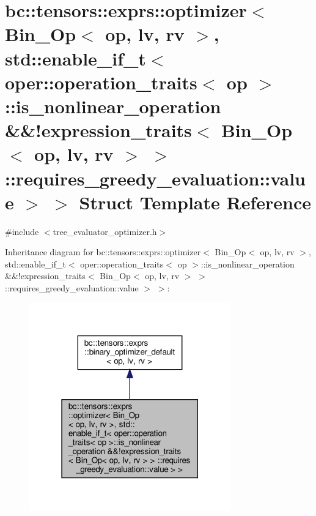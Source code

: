 \hypertarget{structbc_1_1tensors_1_1exprs_1_1optimizer_3_01Bin__Op_3_01op_00_01lv_00_01rv_01_4_00_01std_1_1enfb9b185ed6056cdbdfe04ef149dd3f73}{}\section{bc\+:\+:tensors\+:\+:exprs\+:\+:optimizer$<$ Bin\+\_\+\+Op$<$ op, lv, rv $>$, std\+:\+:enable\+\_\+if\+\_\+t$<$ oper\+:\+:operation\+\_\+traits$<$ op $>$\+:\+:is\+\_\+nonlinear\+\_\+operation \&\&!expression\+\_\+traits$<$ Bin\+\_\+\+Op$<$ op, lv, rv $>$ $>$ \+:\+:requires\+\_\+greedy\+\_\+evaluation\+:\+:value $>$ $>$ Struct Template Reference}
\label{structbc_1_1tensors_1_1exprs_1_1optimizer_3_01Bin__Op_3_01op_00_01lv_00_01rv_01_4_00_01std_1_1enfb9b185ed6056cdbdfe04ef149dd3f73}


{\ttfamily \#include $<$tree\+\_\+evaluator\+\_\+optimizer.\+h$>$}



Inheritance diagram for bc\+:\+:tensors\+:\+:exprs\+:\+:optimizer$<$ Bin\+\_\+\+Op$<$ op, lv, rv $>$, std\+:\+:enable\+\_\+if\+\_\+t$<$ oper\+:\+:operation\+\_\+traits$<$ op $>$\+:\+:is\+\_\+nonlinear\+\_\+operation \&\&!expression\+\_\+traits$<$ Bin\+\_\+\+Op$<$ op, lv, rv $>$ $>$ \+:\+:requires\+\_\+greedy\+\_\+evaluation\+:\+:value $>$ $>$\+:\nopagebreak
\begin{figure}[H]
\begin{center}
\leavevmode
\includegraphics[width=247pt]{structbc_1_1tensors_1_1exprs_1_1optimizer_3_01Bin__Op_3_01op_00_01lv_00_01rv_01_4_00_01std_1_1enfbebef09eab8c4202d07ac39ca4465e4}
\end{center}
\end{figure}


